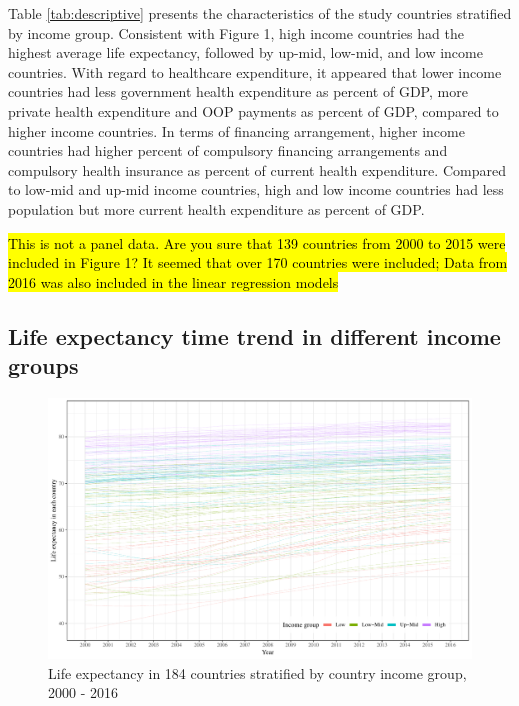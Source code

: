 \documentclass[]{elsarticle} %
\makeatletter
\def\maxwidth{\ifdim\Gin@nat@width>\linewidth\linewidth
\else\Gin@nat@width\fi}
\let\Oldincludegraphics\includegraphics
\renewcommand{\includegraphics}[1]{\Oldincludegraphics[width=\maxwidth]{#1}}
\makeatother
\begin{document}
Table \ref{tab:descriptive} presents the characteristics of the study countries stratified by income group. Consistent with Figure 1, high income countries had the highest average life expectancy, followed by up-mid, low-mid, and low income countries. With regard to healthcare expenditure, it appeared that lower income countries had less government health expenditure as percent of GDP, more private health expenditure and OOP payments as percent of GDP, compared to higher income countries. In terms of financing arrangement, higher income countries had higher percent of compulsory financing arrangements and compulsory health insurance as percent of current health expenditure. Compared to low-mid and up-mid income countries, high and low income countries had less population but more current health expenditure as percent of GDP.

\hl{This is not a panel data. Are you sure that 139 countries from 2000 to 2015 were included in Figure 1? It seemed that over 170 countries were included; Data from 2016 was also included in the linear regression models}

\hypertarget{life-expectancy-time-trend-in-different-income-groups}{%
\subsection{Life expectancy time trend in different income groups}\label{life-expectancy-time-trend-in-different-income-groups}}

\begin{figure}
\centering
\includegraphics{Figures/fig1.pdf}
\caption{\label{fig:fig1}Life expectancy in 184 countries stratified by country income group, 2000 - 2016}
\end{figure}
\end{document}
